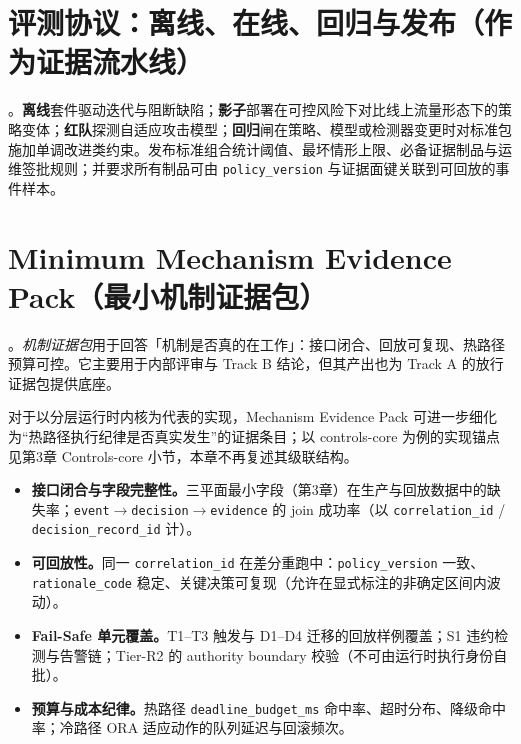 \documentclass[11pt,a4paper]{report}
\begin{document}
\section{评测协议：离线、在线、回归与发布（作为证据流水线）}
\EvalFramework{}。\textbf{离线}套件驱动迭代与阻断缺陷；\textbf{影子}部署在可控风险下对比线上流量形态下的策略变体；\textbf{红队}探测自适应攻击模型；\textbf{回归}闸在策略、模型或检测器变更时对标准包施加单调改进类约束。发布标准组合统计阈值、最坏情形上限、必备证据制品与运维签批规则；并要求所有制品可由 \texttt{policy\_version} 与证据面键关联到可回放的事件样本。

\section{Minimum Mechanism Evidence Pack（最小机制证据包）}
\EvalFramework{}。\emph{机制证据包}用于回答「机制是否真的在工作」：接口闭合、回放可复现、热路径预算可控。它主要用于内部评审与 Track B 结论，但其产出也为 Track A 的放行证据包提供底座。
\par
对于以分层运行时内核为代表的实现，Mechanism Evidence Pack 可进一步细化为“热路径执行纪律是否真实发生”的证据条目；以 controls-core 为例的实现锚点见第3章 Controls-core 小节，本章不再复述其级联结构。
\begin{itemize}
  \item \textbf{接口闭合与字段完整性。}三平面最小字段（第3章）在生产与回放数据中的缺失率；\texttt{event}$\rightarrow$\texttt{decision}$\rightarrow$\texttt{evidence} 的 join 成功率（以 \texttt{correlation\_id} / \texttt{decision\_record\_id} 计）。
  \item \textbf{可回放性。}同一 \texttt{correlation\_id} 在差分重跑中：\texttt{policy\_version} 一致、\texttt{rationale\_code} 稳定、关键决策可复现（允许在显式标注的非确定区间内波动）。
  \item \textbf{Fail-Safe 单元覆盖。}T1--T3 触发与 D1--D4 迁移的回放样例覆盖；S1 违约检测与告警链；Tier-R2 的 authority boundary 校验（不可由运行时执行身份自批）。
  \item \textbf{预算与成本纪律。}热路径 \texttt{deadline\_budget\_ms} 命中率、超时分布、降级命中率；冷路径 ORA 适应动作的队列延迟与回滚频次。
\end{itemize}
\end{document}
